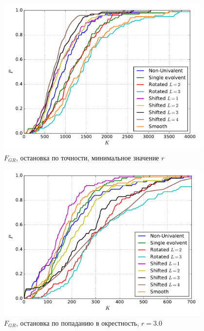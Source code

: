 \documentclass[a4paper]{article}
\begin{document}
\begin{figure}[H]
  \center
  \includegraphics[width=0.95\textwidth]{../f_gr/accuracy/grish_accur_op.pdf}
  \caption{$F_{GR}$, остановка по точности, минимальное значение $r$}
  \label{fig:}
\end{figure}

\begin{figure}[H]
  \center
  \includegraphics[width=0.95\textwidth]{../f_gr/same_r/opt_point/grish_same_r_opt_point.pdf}
  \caption{$F_{GR}$, остановка по попаданию в окрестность, $r=3.0$}
  \label{fig:}
\end{figure}
\end{document}
